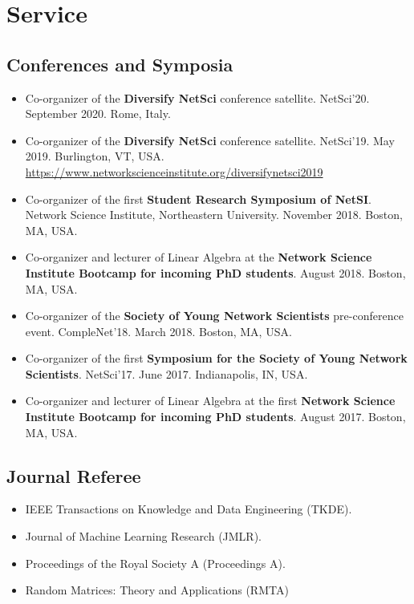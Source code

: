 \documentclass[12pt,]{scrartcl}
\newenvironment{myitemize}
{ \begin{itemize}
    \setlength{\itemsep}{5pt}
    \setlength{\parskip}{0pt}
    \setlength{\parsep}{0pt}     }
{ \end{itemize}                  }
\begin{document}
\section{Service}\label{academic-activities}

\subsection{Conferences and Symposia}\label{conferences}

\begin{myitemize}
\leftskip-0.25in

\item Co-organizer of the \textbf{Diversify NetSci} conference satellite. NetSci'20. September 2020. Rome, Italy.

\item Co-organizer of the \textbf{Diversify NetSci} conference satellite. NetSci'19. May 2019. Burlington, VT, USA. \url{https://www.networkscienceinstitute.org/diversifynetsci2019}

\item Co-organizer of the first \textbf{Student Research Symposium of NetSI}. Network Science Institute, Northeastern University. November 2018. Boston, MA, USA.

\item Co-organizer and lecturer of Linear Algebra at the \textbf{Network Science Institute Bootcamp for incoming PhD students}. August 2018. Boston, MA, USA.

\item Co-organizer of the \textbf{Society of Young Network Scientists} pre-conference event. CompleNet'18. March 2018. Boston, MA, USA.

\item Co-organizer of the first \textbf{Symposium for the Society of Young Network Scientists}. NetSci'17. June 2017. Indianapolis, IN, USA.

\item Co-organizer and lecturer of Linear Algebra at the first \textbf{Network Science Institute Bootcamp for incoming PhD students}. August 2017. Boston, MA, USA.

\end{myitemize}


\subsection{Journal Referee}\label{journal-referee}

\begin{myitemize}
\leftskip-0.25in

\item IEEE Transactions on Knowledge and Data Engineering (TKDE).

\item Journal of Machine Learning Research (JMLR).

\item Proceedings of the Royal Society A (Proceedings A).

\item Random Matrices: Theory and Applications (RMTA)

\end{myitemize}
\end{document}
